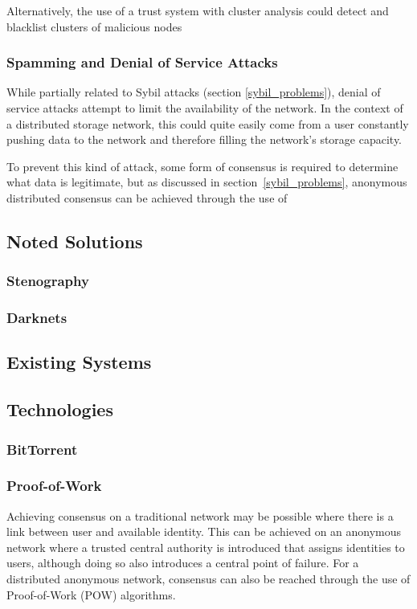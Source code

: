 			Alternatively, the use of a trust system with cluster analysis could detect and blacklist clusters of malicious nodes
		\subsubsection*{Spamming and Denial of Service Attacks}
			While partially related to Sybil attacks (section \ref{sybil_problems}), denial of service attacks attempt to limit the availability of the network. In the context of a distributed storage network, this could quite easily come from a user constantly pushing data to the network and therefore filling the network's storage capacity.
			
			To prevent this kind of attack, some form of consensus is required to determine what data is legitimate, but as discussed in section~\ref{sybil_problems}, anonymous distributed consensus can be achieved through the use of 
	\subsection{Noted Solutions}
		\subsubsection*{Stenography}
		\subsubsection*{Darknets}
	\subsection{Existing Systems}
	\subsection{Technologies}
		\subsubsection*{BitTorrent}
		\subsubsection*{Proof-of-Work}
			Achieving consensus on a traditional network may be possible where there is a link between user and available identity. This can be achieved on an anonymous network where a trusted central authority is introduced that assigns identities to users, although doing so also introduces a central point of failure. For a distributed anonymous network, consensus can also be reached through the use of Proof-of-Work (POW) algorithms.
			
